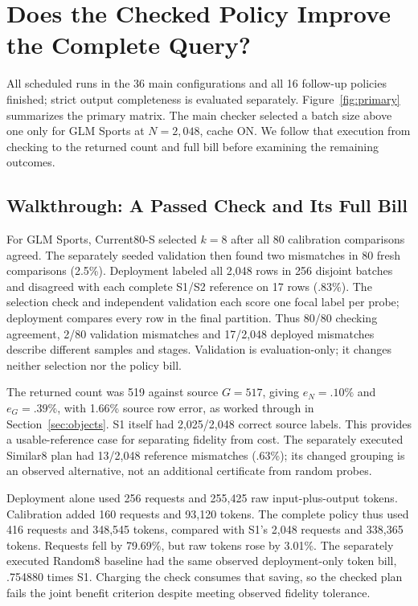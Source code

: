\section{Does the Checked Policy Improve the Complete Query?}
\label{sec:results}
All scheduled runs in the 36 main configurations and all 16 follow-up policies finished; strict output completeness is evaluated separately. Figure~\ref{fig:primary} summarizes the primary matrix. The main checker selected a batch size above one only for GLM Sports at $N=2,048$, cache ON. We follow that execution from checking to the returned count and full bill before examining the remaining outcomes.

\subsection{Walkthrough: A Passed Check and Its Full Bill}
\label{sec:sports_walkthrough}
For GLM Sports, Current80-S selected $k=8$ after all 80 calibration comparisons agreed. The separately seeded validation then found two mismatches in 80 fresh comparisons (2.5\%). Deployment labeled all 2,048 rows in 256 disjoint batches and disagreed with each complete S1/S2 reference on 17 rows (.83\%). The selection check and independent validation each score one focal label per probe; deployment compares every row in the final partition. Thus 80/80 checking agreement, 2/80 validation mismatches and 17/2,048 deployed mismatches describe different samples and stages. Validation is evaluation-only; it changes neither selection nor the policy bill.

The returned count was 519 against source $G=517$, giving $e_N=.10\%$ and $e_G=.39\%$, with 1.66\% source row error, as worked through in Section~\ref{sec:objects}. S1 itself had 2,025/2,048 correct source labels. This provides a usable-reference case for separating fidelity from cost. The separately executed Similar8 plan had 13/2,048 reference mismatches (.63\%); its changed grouping is an observed alternative, not an additional certificate from random probes.

Deployment alone used 256 requests and 255,425 raw input-plus-output tokens. Calibration added 160 requests and 93,120 tokens. The complete policy thus used 416 requests and 348,545 tokens, compared with S1's 2,048 requests and 338,365 tokens. Requests fell by 79.69\%, but raw tokens rose by 3.01\%. The separately executed Random8 baseline had the same observed deployment-only token bill, .754880 times S1. Charging the check consumes that saving, so the checked plan fails the joint benefit criterion despite meeting observed fidelity tolerance.

